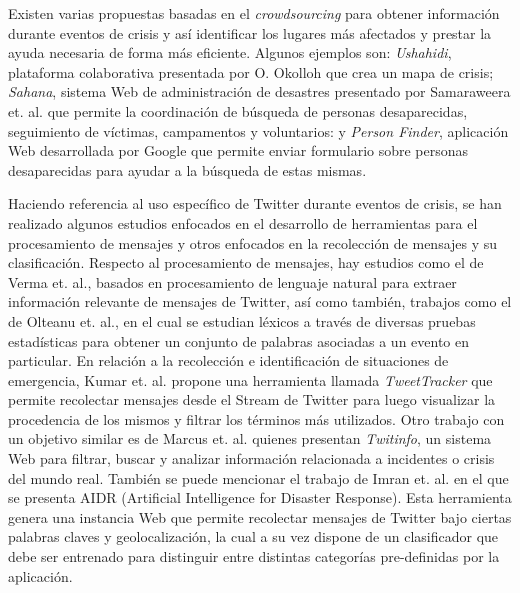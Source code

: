 
Existen varias propuestas basadas en el \textit{crowdsourcing} para obtener información durante eventos de crisis y así identificar los lugares más afectados y prestar la ayuda necesaria de forma más eficiente. 
%
Algunos ejemplos son: \textit{Ushahidi}, plataforma colaborativa presentada por O. Okolloh\cite{okolloh2009ushahidi} que crea un mapa de crisis; \textit{Sahana}, sistema Web de administración de desastres presentado por Samaraweera et. al.\cite{samaraweera2007sahana} que permite la coordinación de búsqueda de personas desaparecidas, seguimiento de víctimas, campamentos y voluntarios: y \textit{Person Finder}, aplicación Web desarrollada por Google que permite enviar formulario sobre personas desaparecidas para ayudar a la búsqueda de estas mismas\cite{PersonFinder}. 

Haciendo referencia al uso específico de Twitter durante eventos de crisis, se han realizado algunos estudios enfocados en el desarrollo de herramientas para el procesamiento de mensajes y otros enfocados en la recolección de mensajes y su clasificación.
%
Respecto al procesamiento de mensajes, hay estudios como el de Verma et. al.\cite{verma2011natural}, basados en procesamiento de lenguaje natural para extraer información relevante de mensajes de Twitter, así como también, trabajos como el de Olteanu et. al.\cite{olteanu2014crisislex}, en el cual se estudian léxicos a través de diversas pruebas estadísticas para obtener un conjunto de palabras asociadas a un evento en particular.
%
En relación a la recolección e identificación de situaciones de emergencia, Kumar et. al.\cite{kumar2011tweettracker} propone una herramienta llamada {\em TweetTracker} que permite recolectar mensajes desde el Stream de Twitter para luego visualizar la procedencia de los mismos y filtrar los términos más utilizados. %
%
Otro trabajo con un objetivo similar es de Marcus et. al.\cite{marcus2011twitinfo} quienes presentan {\em Twitinfo}, un sistema Web para filtrar, buscar y analizar información relacionada a incidentes o crisis del mundo real.
%
También se puede mencionar el trabajo de Imran et. al. \cite{imran2014aidr} en el que se presenta AIDR (Artificial Intelligence for Disaster Response). Esta herramienta genera una instancia Web que permite recolectar mensajes de Twitter bajo ciertas palabras claves y geolocalización, la cual a su vez dispone de un clasificador que debe ser entrenado para distinguir entre distintas categorías pre-definidas por la aplicación.

